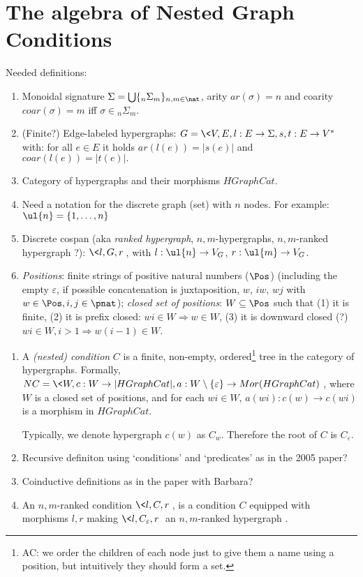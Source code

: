 \section{The algebra of Nested Graph Conditions}

Needed definitions:
\begin{enumerate}
  \item Monoidal signature $\Sigma = \bigcup\{_n\Sigma_m\}_{n,m \in \nat}$, arity $ar(\sigma) = n$ and coarity $coar(\sigma)=m$ iff $\sigma \in {_n\Sigma_m}$.
  \item (Finite?) Edge-labeled hypergraphs: $G =\< V,E,l:E \to \Sigma, s,t:E \to V^*\>$ with: for all $e\in E$ it holds $ar(l(e)) = |s(e)|$ and $coar(l(e)) = |t(e)|.$
  \item Category of hypergraphs and their morphisms $HGraphCat$. 
  \item Need a notation for the discrete graph (set) with $n$ nodes. For example: 
  $\ul{n} = \{1,\ldots, n\}$
  \item Discrete cospan (aka \emph{ranked hypergraph}, $n,m$-hypergraphs, $n,m$-ranked hypergraph ?): $\<l,G,r\>$, with $l:\ul{n} \to V_G$, $r:\ul{m} \to V_G$.
  \item \emph{Positions}: finite strings of positive natural numbers ($\Pos$) (including the empty $\varepsilon$, if possible concatenation is juxtaposition, $w$, $iw$, $wj$ with $w \in \Pos, i,j \in \pnat$); \emph{closed set of positions}: $W \subseteq \Pos$ such that (1) it is finite, (2) it is prefix closed: $wi \in W \Rightarrow w \in W$, (3) it is downward closed (?)  $wi \in W, i > 1 \Rightarrow w(i-1) \in W$. 
\end{enumerate}  


\begin{definition}
  \begin{enumerate}
    \item
    A \emph{(nested) condition} $C$ is a finite, non-empty, ordered\footnote{AC: we order the children of each node just to give them a name using a position, but intuitively they should form a set.} tree in the category of hypergraphs. 
    Formally, $NC = \<W, c:W \to |HGraphCat|, a:W\setminus\{\varepsilon\} \to Mor(HGraphCat)\>$, where $W$ is a closed set of positions, and for each $wi \in W$, $a(wi): c(w) \to c(wi)$ is a morphism in  $HGraphCat$. 

    Typically, we denote hypergraph $c(w)$ as $C_w$. Therefore the root of $C$ is $C_{\varepsilon}$.
    \item Recursive definiton using `conditions' and `predicates' as in the 2005 paper?
    \item Coinductive definitions as in the paper with Barbara? 
    \item An $n,m$-ranked condition $\<l,C,r\>$, is a condition $C$ equipped with morphisms $l,r$ making $\<l,C_{\varepsilon},r\>$  an $n,m$-ranked hypergraph .
  \end{enumerate}
\end{definition}

